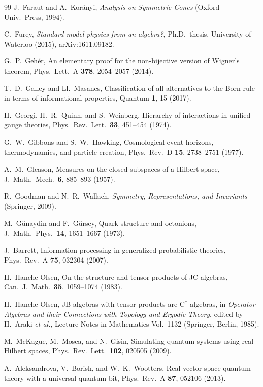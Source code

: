 \documentclass[aps,pra,onecolumn,superscriptaddress,nofootinbib,10pt]{revtex4-2}
\theoremstyle{definition}
\theoremstyle{remark}
\begin{document}
\begin{thebibliography}{99}
 J.~Faraut and A.~Kor\'anyi, \emph{Analysis on Symmetric Cones} (Oxford Univ.\ Press, 1994).

 C.~Furey, \emph{Standard model physics from an algebra?}, Ph.D.\ thesis, University of Waterloo (2015), arXiv:1611.09182.

 G.~P.~Geh\'er, An elementary proof for the non-bijective version of Wigner's theorem, Phys.\ Lett.\ A \textbf{378}, 2054--2057 (2014).

 T.~D.~Galley and Ll.~Masanes, Classification of all alternatives to the Born rule in terms of informational properties, Quantum \textbf{1}, 15 (2017).

 H.~Georgi, H.~R.~Quinn, and S.~Weinberg, Hierarchy of interactions in unified gauge theories, Phys.\ Rev.\ Lett.\ \textbf{33}, 451--454 (1974).

 G.~W.~Gibbons and S.~W.~Hawking, Cosmological event horizons, thermodynamics, and particle creation, Phys.\ Rev.\ D \textbf{15}, 2738--2751 (1977).

 A.~M.~Gleason, Measures on the closed subspaces of a Hilbert space, J.\ Math.\ Mech.\ \textbf{6}, 885--893 (1957).

 R.~Goodman and N.~R.~Wallach, \emph{Symmetry, Representations, and Invariants} (Springer, 2009).

 M.~G\"unaydin and F.~G\"ursey, Quark structure and octonions, J.\ Math.\ Phys.\ \textbf{14}, 1651--1667 (1973).

 J.~Barrett, Information processing in generalized probabilistic theories, Phys.\ Rev.\ A \textbf{75}, 032304 (2007).

 H.~Hanche-Olsen, On the structure and tensor products of JC-algebras, Can.\ J.\ Math.\ \textbf{35}, 1059--1074 (1983).

 H.~Hanche-Olsen, JB-algebras with tensor products are C$^*$-algebras, in \emph{Operator Algebras and their Connections with Topology and Ergodic Theory}, edited by H.~Araki \emph{et al.}, Lecture Notes in Mathematics Vol.~1132 (Springer, Berlin, 1985).

 M.~McKague, M.~Mosca, and N.~Gisin, Simulating quantum systems using real Hilbert spaces, Phys.\ Rev.\ Lett.\ \textbf{102}, 020505 (2009).

 A.~Aleksandrova, V.~Borish, and W.~K.~Wootters, Real-vector-space quantum theory with a universal quantum bit, Phys.\ Rev.\ A \textbf{87}, 052106 (2013).


\end{thebibliography}
\end{document}
